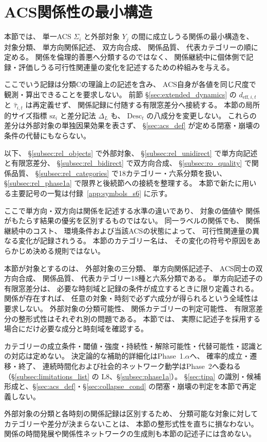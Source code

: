 \section{ACS関係性の最小構造}
\label{sec:rel_min}

本節では、
単一ACS $\Sigma_i$ と外部対象 $Y_j$ の間に成立しうる関係の最小構造を、
対象分類、
単方向関係記述、
双方向合成、
関係品質、
代表カテゴリーの順に定める。
関係を倫理的善悪へ分類するのではなく、
関係継続中に個体側で記録・評価しうる可行性関連量の変化を記述するための枠組みを与える。

ここでいう記録は分類Cの理論上の記述を含み、
ACS自身が各値を同じ尺度で観測・算出できることを要求しない。
前節 \S\ref{sec:extended_dynamics} の $d_{\mathrm{eff},i,t}$ と $\widehat\tau_{i,t}$ は再定義せず、
関係記録に付随する有限窓差分へ接続する。
本節の局所的サイズ指標 $\mathrm{sz}_i$ と差分記法 $\Delta_L$ も、
$\mathrm{Desc}_t$ の八成分を変更しない。
これらの差分は外部対象の単独因果効果を表さず、
\S\ref{sec:acs_def} が定める閉塞・崩壊の条件の代替にもならない。

以下、
\S\ref{subsec:rel_objects} で外部対象、
\S\ref{subsec:rel_unidirect} で単方向記述と有限窓差分、
\S\ref{subsec:rel_bidirect} で双方向合成、
\S\ref{subsec:ro_quality} で関係品質、
\S\ref{subsec:rel_categories} で18カテゴリー・六系分類を扱い、
\S\ref{subsec:rel_phase1a} で限界と後続節への接続を整理する。
本節で新たに用いる主要記号の一覧は付録~\ref{app:symbols_s6} に示す。

ここで単方向・双方向は関係を記述する水準の違いであり、
対象の価値や
関係がもたらす結果の優劣を区別するものではない。
同一ラベルの関係でも、
関係継続中のコスト、
環境条件および当該ACSの状態によって、
可行性関連量の異なる変化が記録されうる。
本節のカテゴリー名は、
その変化の符号や原因をあらかじめ決める規則ではない。

\begin{remark}[本節の射程]
\label{rem:rel_scope}
本節が対象とするのは、
外部対象の三分類、
単方向関係記述子、
ACS同士の双方向合成、
関係品質、
代表カテゴリー18種と六系分類である。
単方向記述子の有限窓差分は、
必要な時刻域と記録の条件が成立するときに限り定義される。
関係が存在すれば、
任意の対象・時刻で必ず六成分が得られるという全域性は要求しない。
外部対象の分類可能性、
関係カテゴリーの判定可能性、
有限窓差分の整形式性はそれぞれ別の問題である。
本節では、
実際に記述子を採用する場合にだけ必要な成分と時刻域を確認する。

カテゴリーの成立条件・閾値・強度・持続性・解除可能性・代替可能性・認識との対応は定めない。
決定論的な補助的詳細化はPhase~1.$\alpha$へ、
確率的成立・遷移・終了、
連続時間化および社会的ネットワーク動学はPhase~2へ委ねる
（\S\ref{subsec:limitations_list} の L8、\S\ref{subsec:phase1a}）。
\S\ref{sec:tipa} の識別・候補形成と、\S\ref{sec:acs_def}・\S\ref{sec:collapse_cond} の閉塞・崩壊の判定を本節で再定義しない。

外部対象の分類と各時刻の関係記録は区別するため、
分類可能な対象に対して
カテゴリーや差分が決まらないことは、
本節の整形式性を直ちに損なわない。
関係の時間発展や関係性ネットワークの生成則も本節の記述子には含めない。
\end{remark}


